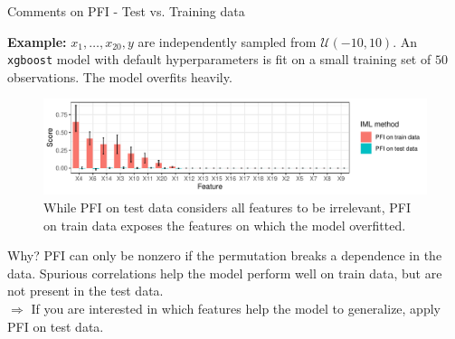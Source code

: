 \documentclass[11pt,compress,t,notes=noshow, aspectratio=169, xcolor=table]{beamer}
\begin{document}
\begin{frame}{Comments on PFI - Test vs. Training data}

\textbf{Example:} $x_1, \dots, x_{20}, y$ are independently sampled from $\mathcal{U} (-10, 10)$. An \texttt{xgboost} model with default hyperparameters is fit on a small training set of $50$ observations. The model overfits heavily.\\

\begin{figure}
  \includegraphics[width=0.9\linewidth]{figure_man/pfi_test_vs_train.pdf}
  \caption{While PFI on test data considers all features to be irrelevant, PFI on train data exposes the features on which the model overfitted.}
\end{figure}

\pause

Why? PFI can only be nonzero if the permutation breaks a dependence in the data. Spurious correlations help the model perform well on train data, but are not present in the test data.\\
$\Rightarrow$ If you are interested in which features help the model to generalize, apply PFI on test data.
  
\end{frame}
\end{document}
